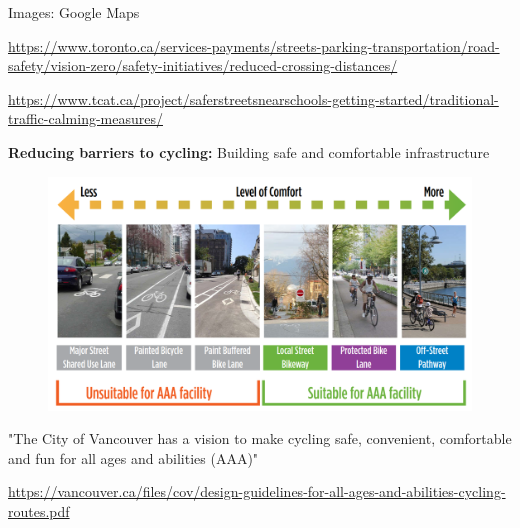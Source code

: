 \documentclass[aspectratio=169]{beamer}
\begin{document}
\begin{frame}
\begin{columns}
		
		
	\end{columns}

	\tiny{Images: Google Maps}
	
	\vspace{2mm}
	
	\tiny\url{https://www.toronto.ca/services-payments/streets-parking-transportation/road-safety/vision-zero/safety-initiatives/reduced-crossing-distances/}
	
	\tiny\url{https://www.tcat.ca/project/saferstreetsnearschools-getting-started/traditional-traffic-calming-measures/}
	
	
	
\end{frame}


















\begin{frame}
	
	\textbf{Reducing barriers to cycling:} Building safe and comfortable infrastructure 
	
	\begin{figure}
		\centering
		\includegraphics[width=0.85\linewidth]{images/bike_inf_comfort.png}
	\end{figure}

	\small{"The City of Vancouver has a vision to make cycling safe,
		convenient, comfortable and fun for all ages and abilities
		(AAA)"}
	\vspace{2mm}
	
	\tiny\url{https://vancouver.ca/files/cov/design-guidelines-for-all-ages-and-abilities-cycling-routes.pdf}
	
\end{frame}
\end{document}
